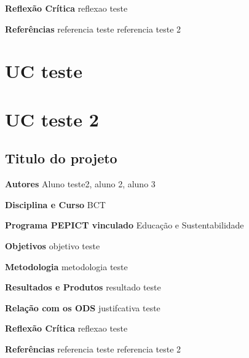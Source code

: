 \documentclass[12pt,openright,oneside,a4paper]{report}
\begin{document}
\vspace{0.7cm}
\noindent
\textbf{Reflexão Crítica}
reflexao teste

\vspace{0.7cm}
\noindent
\textbf{Referências}
referencia teste
referencia teste 2

\vspace{0.7cm}
\chapter{UC teste}

\chapter{UC teste 2}

\section{Titulo do projeto}
\noindent
\textbf{Autores}
Aluno teste2, aluno 2, aluno 3

\vspace{0.7cm}
\noindent
\textbf{Disciplina e Curso}
BCT

\vspace{0.7cm}
\noindent
\textbf{Programa PEPICT vinculado}
Educação e Sustentabilidade

\vspace{0.7cm}
\noindent
\textbf{Objetivos}
objetivo teste

\vspace{0.7cm}
\noindent
\textbf{Metodologia}
metodologia teste

\vspace{0.7cm}
\noindent
\textbf{Resultados e Produtos}
resultado teste

\vspace{0.7cm}
\noindent
\textbf{Relação com os ODS}
justifcativa teste

\vspace{0.7cm}
\noindent
\textbf{Reflexão Crítica}
reflexao teste

\vspace{0.7cm}
\noindent
\textbf{Referências}
referencia teste
referencia teste 2

\vspace{0.7cm}
\end{document}
